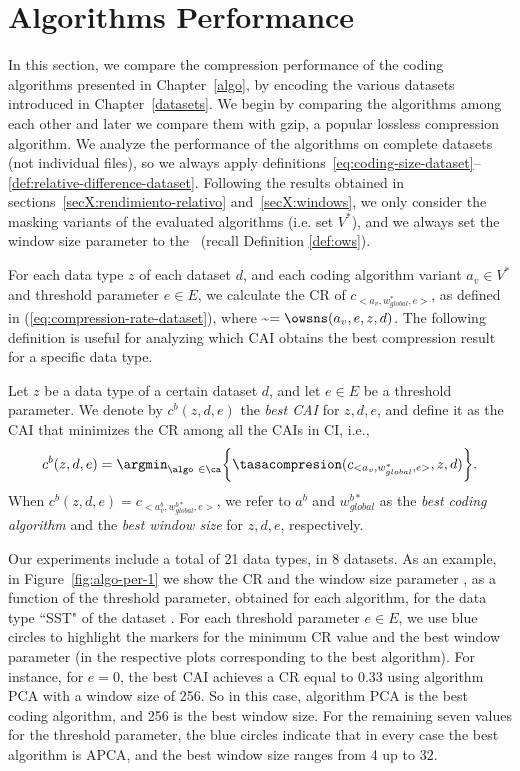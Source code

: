 
\section{Algorithms Performance}
\label{secX:codersmask}


In this section, we compare the compression performance of the coding algorithms presented in Chapter~\ref{algo}, by encoding the various datasets introduced in Chapter~\ref{datasets}. We begin by comparing the algorithms among each other and later we compare them with gzip, a popular lossless compression algorithm. We analyze the performance of the algorithms on complete datasets (not individual files), so we always apply definitions~\ref{eq:coding-size-dataset}--\ref{def:relative-difference-dataset}. Following the results obtained in sections~\ref{secX:rendimiento-relativo} and~\ref{secX:windows}, we only consider the masking variants of the evaluated algorithms (i.e. set $V^{*}$), and we always set the window size parameter to the \owsns\ (recall Definition \ref{def:ows}).


For each data type $z$ of each dataset $d$, and each coding algorithm variant $a_v \in V^{*}$ and threshold parameter $e \in E$, we calculate the CR of $c_{<a_v, w_{global}^{*}, e>}$, as defined in (\ref{eq:compression-rate-dataset}), where \WGlobal\~$=\owsns(a_v, e, z, d)$. The following definition is useful for analyzing which CAI obtains the best compression result for a specific data type.


\begin{defcion}
\label{def:bestcai}
Let $z$ be a data type of a certain dataset $d$, and let $e \in E$ be a threshold parameter. We denote by $c^{b}(z, d, e)$ the \textit{best CAI} for $z, d, e$, and define it as the CAI that minimizes the CR among all the CAIs in CI, i.e.,
\vspace{-3pt}
\begin{equation}
\label{eq:eqbestcai}
c^{b}(z, d, e) = \argmin_{\algo \ \in \ca} \biggl\{ \tasacompresion(c_{<a_v, w_{global}^{*}, e>}, z, d) \biggr\}.
\end{equation}
When $c^{b}(z, d, e) = c_{<a^{b}_v, w_{global}^{b*}, e>}$, we refer to $a^{b}$ and $w_{global}^{b*}$ as the \textit{best coding algorithm} and the \textit{best window size} for $z, d, e$, respectively.
\end{defcion}


Our experiments include a total of 21 data types, in 8 datasets. As an example, in Figure~\ref{fig:algo-per-1} we show the CR and the window size parameter \WGlobal, as a function of the threshold parameter, obtained for each algorithm, for the data type ``SST" of the dataset \datasetelnino. For each threshold parameter $e \in E$, we use blue circles to highlight the markers for the minimum CR value and the best window parameter (in the respective plots corresponding to the best algorithm). For instance, for $e=0$, the best CAI achieves a CR equal to $0.33$ using algorithm PCA with a window size of 256. So in this case, algorithm PCA is the best coding algorithm, and 256 is the best window size. For the remaining seven values for the threshold parameter, the blue circles indicate that in every case the best algorithm is APCA, and the best window size ranges from 4 up to 32.


